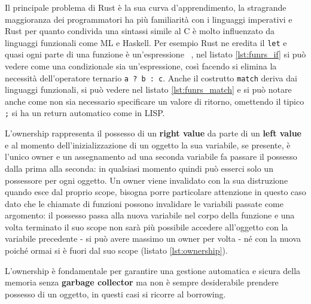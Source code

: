 \documentclass[Lau,binding=0.6cm]{sapthesis}
\newcommand{\textcode}[1]{\colorbox{backcolour}{\texttt{#1}}}
\begin{document}
Il principale problema di Rust è la sua curva d'apprendimento, la stragrande maggioranza dei programmatori ha più familiarità con i linguaggi imperativi e Rust per quanto condivida una sintassi simile al C è molto influenzato da linguaggi funzionali come ML e Haskell. 
Per esempio Rust ne eredita il \textcode{let} e quasi ogni parte di una funzione è un'espressione ~\cite[1309-1573]{rust:syntax}, nel listato \ref{lst:funrs_if} si può vedere come una condizionale sia un'espressione, così facendo si elimina la necessità dell'operatore ternario \textcode{a ? b : c}.
Anche il costrutto \textcode{match} deriva dai linguaggi funzionali, si può vedere nel listato \ref{lst:funrs_match} e si può notare anche come non sia necessario specificare un valore di ritorno, omettendo il tipico \textcode{;} si ha un return automatico come in LISP.







L'ownership rappresenta il possesso di un \textbf{right value} da parte di un \textbf{left value} e al momento dell'inizializzazione di un oggetto la sua variabile, se presente, è l'unico owner e un assegnamento ad una seconda variabile fa passare il possesso dalla prima alla seconda: in qualsiasi momento quindi può esserci solo un possessore per ogni oggetto. 
Un owner viene invalidato con la sua distruzione quando esce dal proprio scope, bisogna porre particolare attenzione in questo caso dato che le chiamate di funzioni possono invalidare le variabili passate come argomento: il possesso passa alla nuova variabile nel corpo della funzione e una volta terminato il suo scope non sarà più possibile accedere all'oggetto con la variabile precedente - si può avere massimo un owner per volta - né con la nuova poiché ormai si è fuori dal suo scope (listato \ref{lst:ownership}). 



L'ownership è fondamentale per garantire una gestione automatica e sicura della memoria senza \textbf{garbage collector} ma non è sempre desiderabile prendere possesso di un oggetto, in questi casi si ricorre al borrowing.
\end{document}
